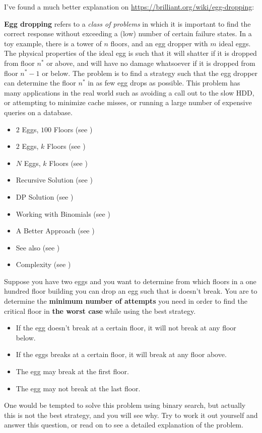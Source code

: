 \qasepline{}

I've found a much better explanation on
\url{https://brilliant.org/wiki/egg-dropping}:

\textbf{Egg dropping} refers to a \emph{class of problems} in which it is
important to find the correct response without exceeding a (low) number of
certain failure states. In a toy example, there is a tower of $n$ floors,
and an egg dropper with $m$ ideal eggs. The physical properties of the ideal
egg is such that it will shatter if it is dropped from floor $n^*$ or above,
and will have no damage whatsoever if it is dropped from floor $n^*-1$ or
below. The problem is to find a strategy such that the egg dropper can
determine the floor $n^*$ in as few egg drops as possible. This problem has
many applications in the real world such as avoiding a call out to the slow
HDD, or attempting to minimize cache misses, or running a large number of
expensive queries on a database.


\begin{itemize}%
\item $2$ Eggs, $100$ Floors (see )
\item $2$ Eggs, $k$ Floors (see )
\item $N$ Eggs, $k$ Floors (see )
\item Recursive Solution (see )
\item DP Solution (see )
\item Working with Binomials (see )
\item A Better Approach (see )
\item See also (see )
\item Complexity (see )
\end{itemize}


Suppose you have two eggs and you want to determine from which floors in a
one hundred floor building you can drop an egg such that is doesn't break.
You are to determine the \textbf{minimum number of attempts} you need in
order to find the critical floor in \textbf{the worst case} while using the
best strategy.
\begin{itemize}%
\item If the egg doesn't break at a certain floor, it will not break at any
  floor below.
\item If the eggs breaks at a certain floor, it will break at any floor
  above.
\item The egg may break at the first floor.
\item The egg may not break at the last floor.
\end{itemize}
One would be tempted to solve this problem using binary search, but actually
this is not the best strategy, and you will see why. Try to work it out
yourself and answer this question, or read on to see a detailed explanation
of the problem.

